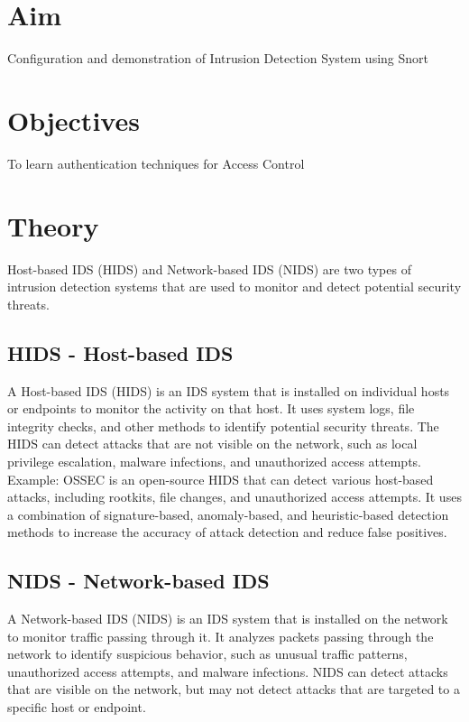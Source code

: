\documentclass[11pt]{article}
\begin{document}
\tableofcontents
\thispagestyle{empty}
\clearpage

\setcounter{page}{1}

\section{Aim}
Configuration and demonstration of Intrusion Detection System using Snort

\section{Objectives}
To learn authentication techniques for Access Control


\section{Theory}

Host-based IDS (HIDS) and Network-based IDS (NIDS) are two types of intrusion detection systems that are used to monitor and detect potential security threats.

\subsection{HIDS - Host-based IDS}

A Host-based IDS (HIDS) is an IDS system that is installed on individual hosts or endpoints to monitor the activity on that host. It uses system logs, file integrity checks, and other methods to identify potential security threats. The HIDS can detect attacks that are not visible on the network, such as local privilege escalation, malware infections, and unauthorized access attempts.\\

Example: OSSEC is an open-source HIDS that can detect various host-based attacks, including rootkits, file changes, and unauthorized access attempts. It uses a combination of signature-based, anomaly-based, and heuristic-based detection methods to increase the accuracy of attack detection and reduce false positives.

\subsection{NIDS - Network-based IDS}

A Network-based IDS (NIDS) is an IDS system that is installed on the network to monitor traffic passing through it. It analyzes packets passing through the network to identify suspicious behavior, such as unusual traffic patterns, unauthorized access attempts, and malware infections. NIDS can detect attacks that are visible on the network, but may not detect attacks that are targeted to a specific host or endpoint.\\
\end{document}
